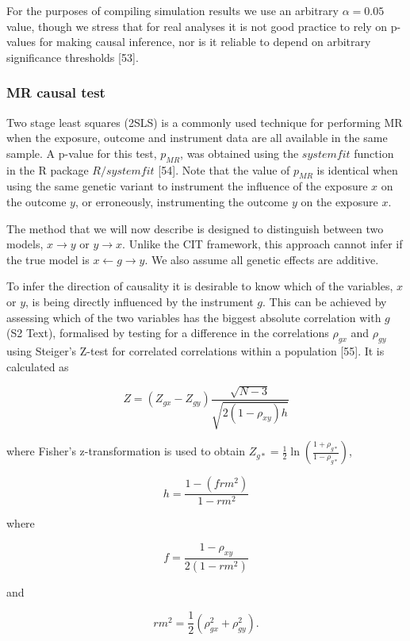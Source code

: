 \documentclass[]{article}
\begin{document}
For the purposes of compiling simulation results we use an arbitrary
\(\alpha = 0.05\) value, though we stress that for real analyses it is
not good practice to rely on p-values for making causal inference, nor
is it reliable to depend on arbitrary significance thresholds {[}53{]}.

\subsubsection{MR causal test}\label{mr-causal-test}

Two stage least squares (2SLS) is a commonly used technique for
performing MR when the exposure, outcome and instrument data are all
available in the same sample. A p-value for this test, \(p_{MR}\), was
obtained using the \(systemfit\) function in the R package
\(R/systemfit\) {[}54{]}. Note that the value of \(p_{MR}\) is identical
when using the same genetic variant to instrument the influence of the
exposure \(x\) on the outcome \(y\), or erroneously, instrumenting the
outcome \(y\) on the exposure \(x\).

The method that we will now describe is designed to distinguish between
two models, \(x \rightarrow y\) or \(y \rightarrow x\). Unlike the CIT
framework, this approach cannot infer if the true model is
\(x \leftarrow g \rightarrow y\). We also assume all genetic effects are
additive.

To infer the direction of causality it is desirable to know which of the
variables, \(x\) or \(y\), is being directly influenced by the
instrument \(g\). This can be achieved by assessing which of the two
variables has the biggest absolute correlation with \(g\) (S2 Text),
formalised by testing for a difference in the correlations \(\rho_{gx}\)
and \(\rho_{gy}\) using Steiger's Z-test for correlated correlations
within a population {[}55{]}. It is calculated as

\[
Z = (Z_{gx} - Z_{gy}) \frac{\sqrt{N-3}}{\sqrt{2(1-\rho_{xy})h}}
\]

where Fisher's z-transformation is used to obtain
\(Z_{g*} = \frac{1}{2} \ln \left ( \frac{1+\rho_{g*}}{1-\rho_{g*}} \right )\),

\[
h = \frac{1 - (frm^2)} {1 - rm^2}
\]

where

\[
f = \frac{1 - \rho_{xy}}{2(1 - rm^2)}
\]

and

\[
rm^2 = \frac{1}{2}(\rho_{gx}^2 + \rho_{gy}^2).
\]
\end{document}
